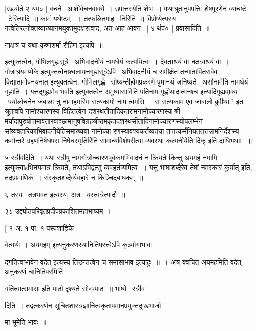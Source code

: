 \documentclass[11pt, openany]{book}
\begin{document}
 [उद्द्योते २ यप० ] वचने \textendash\ आशीर्वचनवाक्ये~। उपात्तस्येति शेषः~॥
यथाश्रुतानुपपत्तिः शेषपूरणेन व्याचष्टे \textendash\ टेरित्यादि~॥ कामं यथेष्टम्
~। तत्फलितमाह \textendash\ निरिति~॥ विप्रोष्येत्यस्य
गत्वेतिरत्नोक्तव्याख्यानमयुक्तमुदक्षरत्वाद्, अत आह आक्न \textendash\ [ ४ र्थप० ]
प्रवासादिति~॥



 नाक्षत्रं च यथा कृष्णशर्मा रौहिण इत्यपि~॥ 

 इत्युक्तत्वेन, गोभिलगृह्यसूत्रे \textendash\ {\qt अभिवादनीयं नामधेयं कल्पयित्वा~। 
देवताश्रयं वा नक्षत्राश्रयं वा~। गोत्राश्रयमप्येके}
इत्युक्तत्वेनाश्वलायनगृह्मसूत्रेऽपि \textendash\ {\qt अभिवादनीयं च समीक्षेत
तन्मातापितरावेव विद्यातामोपनयनात्} इत्युक्तत्वेन,
गोभिलगृह्णे \textendash\ सोष्यन्तीहोमप्रकरणे {\qt पुमानयं जनिष्यते \textendash\ असौनामेति नामधेयं
गृह्णाति~। यत्तद्गुह्यमेव भवति} इत्युक्तत्वेन {\qt अमुष्यासाविति पतिनाम
गृह्णीयादात्मनश्च इत्यादिगृह्यवा्क्य \textendash\ पर्यालोचनेन} जबाला तु नामाहमस्मि
सत्यकामो नाम त्वमसि~। स सत्यकाम एव जाबालो ब्रुवीथाः? इत श्रुतावपि
नामोश्चारणस्य विहितत्वेन दशरथतीतादिकृतरामनामोच्चारणस्य श्री
मर्यादापुरुषोत्तमावतारवाञ्छामानुषविग्रहश्रीरामकृतदशरथसीतादिनामोच्चारणस्योपलम्भेन
सांव्यवहारिकाभिवादनीयेतिसमाख्यया नामोच्चा रणस्यावश्यकर्तव्यतया
तत्तत्कर्मंनियततत्तन्नामनिर्देशस्य कर्मान्तरे ग्रहणनिषेधपरा
निषेधस्मृतिरिति सामान्यविशेषरीत्या व्यवस्था कल्पनीयेति दिक् इति दाधिभथाः
~॥ 

५ स्त्रीवदिति~। यथा स्त्रीषु नामगोत्रोच्चारणपूर्वकमभिवादनं न क्रियते
{\qt किन्तु अयमहं नमामि} इत्युक्त्वाsभिनयमात्रं क्रियते, तथाऽविद्वत्सु
व्यवहर्तव्यमित्यः~। यत्तु {\qt भाषाशब्दैरेव} तेषां नमस्कारं कुर्यात् इति,
तदप्रामाणिकं~। संस्कृतशब्दैर्व्यवहारे न किञ्चिद्बाधकम्~॥ 

६ तस्य \textendash\ तत्रभवत इत्यस्य, अत्र \textendash\ यस्त्वत्रेत्यादौ~॥ 

३८ उद्द्योतपरिवृतप्रदीपप्रकाशितमहाभाष्यम्~। 

 [ १ अ. १ पा. १ पस्पशाह्निके



वेत्यर्थः~। {\qt अयमहम्} इत्यनुकरणस्यानितिपरत्त्वेऽपि कृञ्योगाभावा \textendash\ 

द्गतित्वाभावेन {\qt वदेत्} इत्यस्य तिङन्तत्वेन च समासाभाव इत्याहुः~॥~। अत्र
क्वचित् अयमहमिति वदेत्~। अनुकरणं चानितिपरमिति

गतित्वात्समासः इति पाठो दृश्यते सोsपपाठः~॥ भाष्ये \textendash\ स्त्रीव \textendash\ 

दिति~। तद्वत्करणेन सू्चितशास्त्रज्ञानित्वकृतापमानप्रयुक्तदुःखभाजो

मा भूमेति भावः~॥
\end{document}
